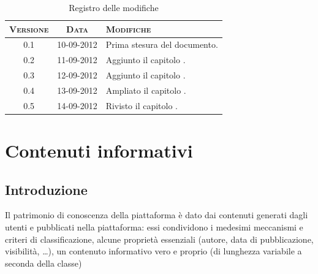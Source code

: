 \documentclass[10pt,a4paper,headinclude,footinclude,hidelinks]{scrreprt} %
\begin{document}
    \title{\rmfamily\normalfont{}}
    \author{}
    \date{\today}
    
    \maketitle
    
    \begin{abstract}
        \noindent Il documento presenta i risultati delle fasi di analisi e di progettazione dei nuovi criteri di classificazione.
    \end{abstract}
    
	\begin{table}[ht]
	\centering
	\begin{tabular}{|c|c|l|}
	\hline
	\textsc{Versione} & \textsc{Data} & \textsc{Modifiche} \\ \hline
	0.1 & 10-09-2012 & Prima stesura del documento. \\ \hline
	0.2 & 11-09-2012 & Aggiunto il capitolo \nameref{ch:stage:contenuti}. \\ \hline
	0.3 & 12-09-2012 & Aggiunto il capitolo \nameref{ch:stage:req}. \\ \hline
	0.4 & 13-09-2012 & Ampliato il capitolo \nameref{ch:stage:req}. \\ \hline
	0.5 & 14-09-2012 & Rivisto il capitolo \nameref{ch:stage:req}. \\ \hline
	\end{tabular}
	\caption{Registro delle modifiche}
	\label{tab:stage:wp:workload}
	\end{table}

	\tableofcontents
	\listoffigures
	\begingroup
	\let\clearpage\relax
	\listoftables
	\endgroup

	\chapter{Contenuti informativi}
	\label{ch:stage:contenuti}
	\section{Introduzione}
	Il patrimonio di conoscenza della piattaforma è dato dai contenuti generati dagli utenti e pubblicati nella piattaforma: essi condividono i medesimi meccanismi e criteri di classificazione, alcune proprietà essenziali (autore, data di pubblicazione, visibilità, \ldots), un contenuto informativo vero e proprio (di lunghezza variabile a seconda della classe)
\end{document}
